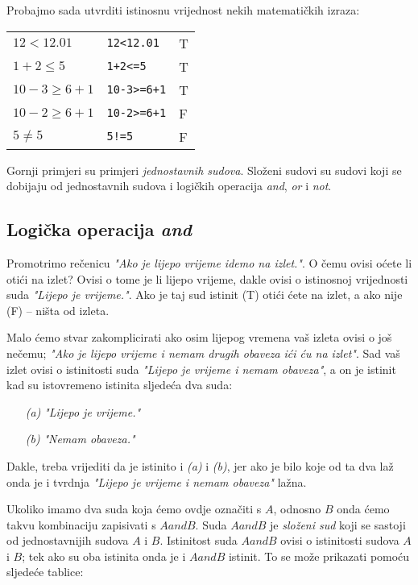 Probajmo sada utvrditi istinosnu vrijednost nekih matemati\v{c}kih izraza:

\begin{tabular}{lll}
	$12<12.01$ & \verb+12<12.01+ & T\\
	$1+2\leq 5$ & \verb"1+2<=5" & T\\
	$10-3\geq 6+1$ & \verb"10-3>=6+1" & T \\
	$10-2\geq 6+1$ & \verb"10-2>=6+1" & F \\
	$5\neq 5$ & \verb"5!=5" & F
\end{tabular}

Gornji primjeri su primjeri \emph{jednostavnih sudova}. Slo\v{z}eni
sudovi su sudovi koji se dobijaju od jednostavnih sudova i logi\v{c}kih
operacija \emph{and}, \emph{or} i \emph{not}.

\subsection{Logi\v{c}ka operacija \emph{and}}

Promotrimo re\v{c}enicu \emph{"Ako je lijepo vrijeme
idemo na izlet."}. O \v{c}emu ovisi o\'{c}ete li
oti\'{c}i na izlet? Ovisi o tome je li lijepo vrijeme, dakle ovisi o
istinosnoj vrijednosti suda \emph{"Lijepo je vrijeme."}. Ako je
taj sud istinit (T) oti\'{c}i \'{c}ete na izlet, a ako nije (F) -- ni\v{s}ta
od izleta.

Malo \'{c}emo stvar zakomplicirati ako osim lijepog vremena va\v{s} izleta
ovisi o jo\v{s} ne\v{c}emu; \emph{"Ako je lijepo vrijeme i nemam drugih obaveza
i\'{c}i \'{c}u na izlet"}.
Sad va\v{s} izlet ovisi o istinitosti suda \emph{"Lijepo je vrijeme i nemam obaveza"}, a on je istinit
kad su istovremeno istinita sljede\'{c}a dva suda:

\begin{itemize}
	\item[\emph{(a)}] \emph{"Lijepo je vrijeme."}
	\item[\emph{(b)}] \emph{"Nemam obaveza."}
\end{itemize}

Dakle, treba vrijediti da je istinito i \emph{(a)} i \emph{(b)},
jer ako je bilo koje od ta dva la\v{z} onda je i tvrdnja \emph{"Lijepo
je vrijeme i nemam obaveza"} la\v{z}na.

Ukoliko imamo dva suda koja \'{c}emo ovdje ozna\v{c}iti s $A$, odnosno
$B$ onda \'{c}emo takvu kombinaciju zapisivati s $A and B$. Suda $A
and B$ je \emph{slo\v{z}eni sud} koji se sastoji od jednostavnijih
sudova $A$ i $B$. Istinitost suda $A and B$ ovisi o istinitosti
sudova $A$ i $B$; tek ako su oba istinita onda je i $A and B$
istinit. To se mo\v{z}e prikazati pomo\'{c}u sljede\'{c}e tablice:


